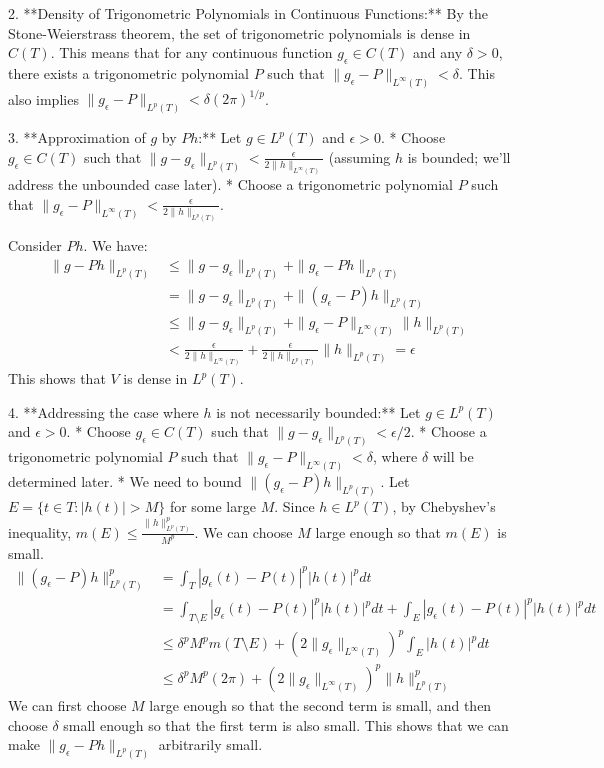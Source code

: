 2.  **Density of Trigonometric Polynomials in Continuous Functions:** By the Stone-Weierstrass theorem, the set of trigonometric polynomials is dense in $C(T)$. This means that for any continuous function $g_\epsilon \in C(T)$ and any $\delta > 0$, there exists a trigonometric polynomial $P$ such that $\|g_\epsilon - P\|_{L^\infty(T)} < \delta$. This also implies $\|g_\epsilon - P\|_{L^p(T)} < \delta (2\pi)^{1/p}$.

3.  **Approximation of $g$ by $P h$:** Let $g \in L^p(T)$ and $\epsilon > 0$.
    * Choose $g_\epsilon \in C(T)$ such that $\|g - g_\epsilon\|_{L^p(T)} < \frac{\epsilon}{2 \|h\|_{L^\infty(T)}}$ (assuming $h$ is bounded; we'll address the unbounded case later).
    * Choose a trigonometric polynomial $P$ such that $\|g_\epsilon - P\|_{L^\infty(T)} < \frac{\epsilon}{2 \|h\|_{L^p(T)}}$.

    Consider $P h$. We have:
    \begin{align*} \|g - Ph\|_{L^p(T)} &\le \|g - g_\epsilon\|_{L^p(T)} + \|g_\epsilon - Ph\|_{L^p(T)} \\ &= \|g - g_\epsilon\|_{L^p(T)} + \|(g_\epsilon - P)h\|_{L^p(T)} \\ &\le \|g - g_\epsilon\|_{L^p(T)} + \|g_\epsilon - P\|_{L^\infty(T)} \|h\|_{L^p(T)} \\ &< \frac{\epsilon}{2 \|h\|_{L^\infty(T)}} + \frac{\epsilon}{2 \|h\|_{L^p(T)}} \|h\|_{L^p(T)} = \epsilon \end{align*}
    This shows that $V$ is dense in $L^p(T)$.

4.  **Addressing the case where $h$ is not necessarily bounded:**
    Let $g \in L^p(T)$ and $\epsilon > 0$.
    * Choose $g_\epsilon \in C(T)$ such that $\|g - g_\epsilon\|_{L^p(T)} < \epsilon/2$.
    * Choose a trigonometric polynomial $P$ such that $\|g_\epsilon - P\|_{L^\infty(T)} < \delta$, where $\delta$ will be determined later.
    * We need to bound $\|(g_\epsilon - P)h\|_{L^p(T)}$. Let $E = \{t \in T : |h(t)| > M\}$ for some large $M$. Since $h \in L^p(T)$, by Chebyshev's inequality, $m(E) \le \frac{\|h\|_{L^p(T)}^p}{M^p}$. We can choose $M$ large enough so that $m(E)$ is small.
    \begin{align*} \|(g_\epsilon - P)h\|_{L^p(T)}^p &= \int_T |g_\epsilon(t) - P(t)|^p |h(t)|^p dt \\ &= \int_{T \setminus E} |g_\epsilon(t) - P(t)|^p |h(t)|^p dt + \int_E |g_\epsilon(t) - P(t)|^p |h(t)|^p dt \\ &\le \delta^p M^p m(T \setminus E) + (2 \|g_\epsilon\|_{L^\infty(T)})^p \int_E |h(t)|^p dt \\ &\le \delta^p M^p (2\pi) + (2 \|g_\epsilon\|_{L^\infty(T)})^p \|h\|_{L^p(T)}^p \end{align*}
    We can first choose $M$ large enough so that the second term is small, and then choose $\delta$ small enough so that the first term is also small. This shows that we can make $\|g_\epsilon - Ph\|_{L^p(T)}$ arbitrarily small.

